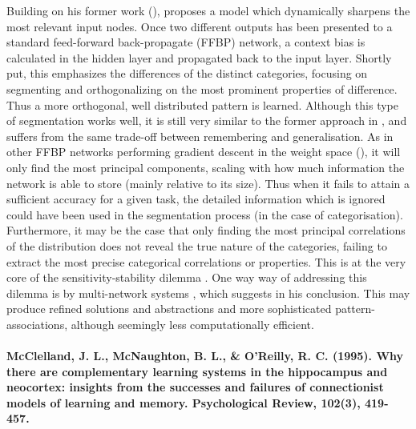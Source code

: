 Building on his former work (\cite{French1992}), \cite{French1994} proposes a model which dynamically sharpens the most relevant input nodes. Once two different outputs has been presented to a standard feed-forward back-propagate (FFBP) network, a context bias is calculated in the hidden layer and propagated back to the input layer. Shortly put, this emphasizes the differences of the distinct categories, focusing on segmenting and orthogonalizing on the most prominent properties of difference. Thus a more orthogonal, well distributed pattern is learned.
Although this type of segmentation works well, it is still very similar to the former approach in \cite{French1992}, and suffers from the same trade-off between remembering and generalisation. As in other FFBP networks performing gradient descent in the weight space (\cite{Hinton1989}), it will only find the most principal components, scaling with how much information the network is able to store (mainly relative to its size). Thus when it fails to attain a sufficient accuracy for a given task, the detailed information which is ignored could have been used in the segmentation process (in the case of categorisation). Furthermore, it may be the case that only finding the most principal correlations of the distribution does not reveal the true nature of the categories, failing to extract the most precise categorical correlations or properties. This is at the very core of the sensitivity-stability dilemma \cite{Hebb1949}. One way way of addressing this dilemma is by multi-network systems , which \cite{French1994} suggests in his conclusion. This may produce refined solutions and abstractions and more sophisticated pattern-associations, although seemingly less computationally efficient.
\\
\\
\textbf{McClelland, J. L., McNaughton, B. L., \& O’Reilly, R. C. (1995). Why there are complementary learning systems in the hippocampus and neocortex: insights from the successes and failures of connectionist models of learning and memory. Psychological Review, 102(3), 419-457.}

